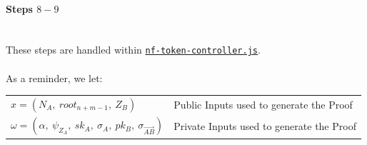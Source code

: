 \documentclass{article}
\begin{document}
\paragraph{Steps $8 - 9$}
\ \\
These steps are handled within \hyperref[sec:nf-token-controller]{\texttt{nf-token-controller.js}}.\\
\\
As a reminder, we let:
\begin{center}
  \begin{tabular}{l l}
    $x = (N_{A},\
          root_{n+m-1},\
          Z_B)$ & Public Inputs used to generate the Proof\\
    $\omega = (\alpha,\
              \psi_{Z_A},\
              sk_A,\
              \sigma_{A},\
              pk_B,\
              \sigma_{\vec{AB}})$ & Private Inputs used to generate the Proof\\
  \end{tabular}
\end{center}
\end{document}
